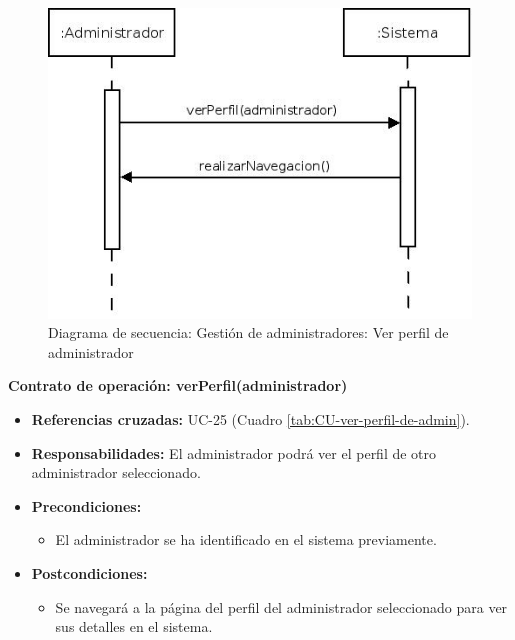 \begin{figure}[H]
\centering
  \includegraphics[scale=.55]{img/secuencias/gestion-administradores-ver-perfil.jpeg}
  \caption{Diagrama de secuencia: Gestión de administradores: Ver perfil de administrador}
  \label{fig:secuencia-gestion-administradores-ver-perfil}
\end{figure}

\textbf{Contrato de operación: verPerfil(administrador)}
\begin{itemize}
\item \textbf{Referencias cruzadas:} UC-25 (Cuadro \ref{tab:CU-ver-perfil-de-admin}).
\item \textbf{Responsabilidades:} El administrador podrá ver el perfil de otro administrador seleccionado.
\item \textbf{Precondiciones:} 
 \begin{itemize}
\item El administrador se ha identificado en el sistema previamente.
\end {itemize}
\item \textbf{Postcondiciones:} 
 \begin{itemize}
\item Se navegará a la página del perfil del administrador seleccionado para ver sus detalles en el sistema.
\end {itemize}
\end {itemize}

